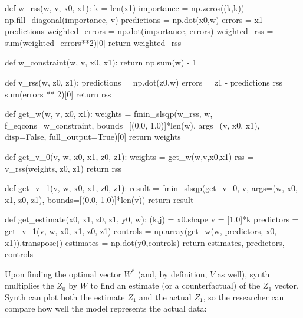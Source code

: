 \documentclass[11pt, a4paper, leqno]{article}
\begin{document}
\begin{python}
def w_rss(w, v, x0, x1):
    k = len(x1)
    importance = np.zeros((k,k))
    np.fill_diagonal(importance, v)
    predictions = np.dot(x0,w)
    errors = x1 - predictions
    weighted_errors = np.dot(importance, errors)
    weighted_rss = sum(weighted_errors**2)[0]
    return weighted_rss

def w_constraint(w, v, x0, x1):
    return np.sum(w) - 1

def v_rss(w, z0, z1):
    predictions = np.dot(z0,w)
    errors = z1 - predictions
    rss = sum(errors ** 2)[0]
    return rss

def get_w(w, v, x0, x1):
    weights = fmin_slsqp(w_rss, w, f_eqcons=w_constraint, 
             bounds=[(0.0, 1.0)]*len(w),
             args=(v, x0, x1), disp=False, full_output=True)[0]
    return weights

def get_v_0(v, w, x0, x1, z0, z1):
    weights = get_w(w,v,x0,x1)
    rss = v_rss(weights, z0, z1)
    return rss

def get_v_1(v, w, x0, x1, z0, z1):
    result = fmin_slsqp(get_v_0, v, args=(w, x0, x1, z0, z1), 
            bounds=[(0.0, 1.0)]*len(v))
    return result

def get_estimate(x0, x1, z0, z1, y0, w):
    (k,j) = x0.shape
    v = [1.0]*k
    predictors = get_v_1(v, w, x0, x1, z0, z1)
    controls = np.array(get_w(w, predictors, x0, x1)).transpose()
    estimates = np.dot(y0,controls)
    return estimates, predictors, controls
\end{python}

Upon finding the optimal vector $W^*$ (and, by definition, $V$ as well), synth multiplies the $Z_0$ by $W$ to find an estimate (or a counterfactual) of the $Z_1$ vector. Synth can plot both the estimate $Z_1$ and the actual $Z_1$, so the researcher can compare how well the model represents the actual data:\\
\end{document}
